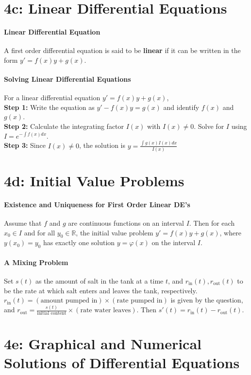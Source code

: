 \documentclass[10pt,letter]{article}
\begin{document}
\section*{4c: Linear Differential Equations}
\paragraph{Linear Differential Equation} 
A first order differential equation is said to be \textbf{linear} if it can be written in the form $y'=f(x)y+g(x)$. 
\paragraph{Solving Linear Differential Equations}
For a linear differential equation $y'=f(x)y+g(x)$, \\ 
\textbf{Step 1:} Write the equation as $y'-f(x)y=g(x)$ and identify $f(x)$ and $g(x)$. \\ 
\textbf{Step 2:} Calculate the integrating factor $I(x)$ with $I(x)\neq0$. Solve for $I$ using $I=e^{-\int f(x)dx}$. \\ 
\textbf{Step 3:} Since $I(x)\neq0$, the solution is $y=\frac{\int g(x)I(x)dx}{I(x)}$

\section*{4d: Initial Value Problems}
\paragraph{Existence and Uniqueness for First Order Linear DE's}
Assume that $f$ and $g$ are continuous functions on an interval $I$. Then for each $x_0\in I$ and for all $y_0\in \mathbb{R}$, the initial value problem $y'=f(x)y+g(x)$, where $y(x_0)=y_0$ has exactly one solution $y=\varphi(x)$ on the interval $I$. 

\paragraph{A Mixing Problem}
Set $s(t)$ as the amount of salt in the tank at a time $t$, and $r_{\text{in}}(t),r_{\text{out}}(t)$ to be the rate at which salt enters and leaves the tank, respectively. $r_\text{in}(t)=(\text{amount pumped in})\times(\text{rate pumped in})$ is given by the question, and $r_{\text{out}}=\frac{s(t)}{\text{initial content}}\times(\text{rate water leaves})$. Then $s'(t)=r_\text{in}(t)-r_\text{out}(t)$. 

\section*{4e: Graphical and Numerical Solutions of Differential Equations}
\end{document}
